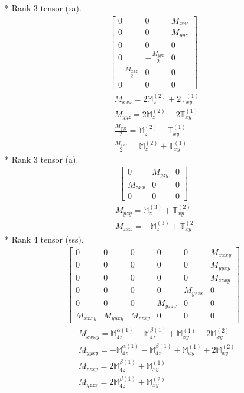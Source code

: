 \documentclass[fleqn,8pt,landscape]{jsarticle}
\begin{document}
* Rank 3 tensor (sa).
\begin{align*}
\begin{bmatrix} 0 & 0 & M_{xxz} \\ 0 & 0 & M_{yyz} \\ 0 & 0 & 0 \\ 0 & - \frac{M_{yyz}}{2} & 0 \\ - \frac{M_{xxz}}{2} & 0 & 0 \\ 0 & 0 & 0 \end{bmatrix}
\end{align*}
\begin{align*}
& M_{xxz} = 2 \mathbb{M}_{z}^{(2)} + 2 \mathbb{T}_{xy}^{(1)} \\
& M_{yyz} = 2 \mathbb{M}_{z}^{(2)} - 2 \mathbb{T}_{xy}^{(1)} \\
& \frac{M_{yyz}}{2} = \mathbb{M}_{z}^{(2)} - \mathbb{T}_{xy}^{(1)} \\
& \frac{M_{xxz}}{2} = \mathbb{M}_{z}^{(2)} + \mathbb{T}_{xy}^{(1)}
\end{align*}
* Rank 3 tensor (a).
\begin{align*}
\begin{bmatrix} 0 & M_{yzy} & 0 \\ M_{zxx} & 0 & 0 \\ 0 & 0 & 0 \end{bmatrix}
\end{align*}
\begin{align*}
& M_{yzy} = \mathbb{M}_{z}^{(3)} + \mathbb{T}_{xy}^{(2)} \\
& M_{zxx} = - \mathbb{M}_{z}^{(3)} + \mathbb{T}_{xy}^{(2)}
\end{align*}
* Rank 4 tensor (sss).
\begin{align*}
\begin{bmatrix} 0 & 0 & 0 & 0 & 0 & M_{xxxy} \\ 0 & 0 & 0 & 0 & 0 & M_{yyxy} \\ 0 & 0 & 0 & 0 & 0 & M_{zzxy} \\ 0 & 0 & 0 & 0 & M_{yzzx} & 0 \\ 0 & 0 & 0 & M_{yzzx} & 0 & 0 \\ M_{xxxy} & M_{yyxy} & M_{zzxy} & 0 & 0 & 0 \end{bmatrix}
\end{align*}
\begin{align*}
& M_{xxxy} = \mathbb{M}_{4z}^{\alpha(1)} - \mathbb{M}_{4z}^{\beta(1)} + \mathbb{M}_{xy}^{(1)} + 2 \mathbb{M}_{xy}^{(2)} \\
& M_{yyxy} = - \mathbb{M}_{4z}^{\alpha(1)} - \mathbb{M}_{4z}^{\beta(1)} + \mathbb{M}_{xy}^{(1)} + 2 \mathbb{M}_{xy}^{(2)} \\
& M_{zzxy} = 2 \mathbb{M}_{4z}^{\beta(1)} + \mathbb{M}_{xy}^{(1)} \\
& M_{yzzx} = 2 \mathbb{M}_{4z}^{\beta(1)} + \mathbb{M}_{xy}^{(2)}
\end{align*}
\end{document}
